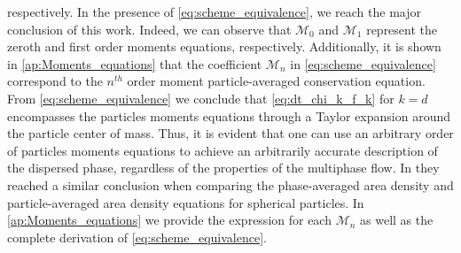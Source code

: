 respectively. 
In the presence of \ref{eq:scheme_equivalence}, we reach the major conclusion of this work. 
Indeed, we can observe that $\mathcal{M}_0$ and $\mathcal{M}_1$ represent the zeroth and first order moments equations, respectively. 
Additionally, it is shown in \ref{ap:Moments_equations} that the coefficient $\mathcal{M}_n$ in \ref{eq:scheme_equivalence} correspond to the $n^{th}$ order moment particle-averaged conservation equation. 
From \ref{eq:scheme_equivalence} we conclude that \ref{eq:dt_chi_k_f_k} for $k=d$ encompasses the particles moments equations through a Taylor expansion around the particle center of mass. 
Thus, it is evident that one can use an arbitrary order of particles moments equations to achieve an arbitrarily accurate description of the dispersed phase, regardless of the properties of the multiphase flow.
In \cite{lhuillier2000bilan} they reached a similar conclusion when comparing the phase-averaged area density and particle-averaged area density equations for spherical particles. 
In \ref{ap:Moments_equations} we provide the expression for each $\mathcal{M}_n$ as well as the complete derivation of \ref{eq:scheme_equivalence}. 


